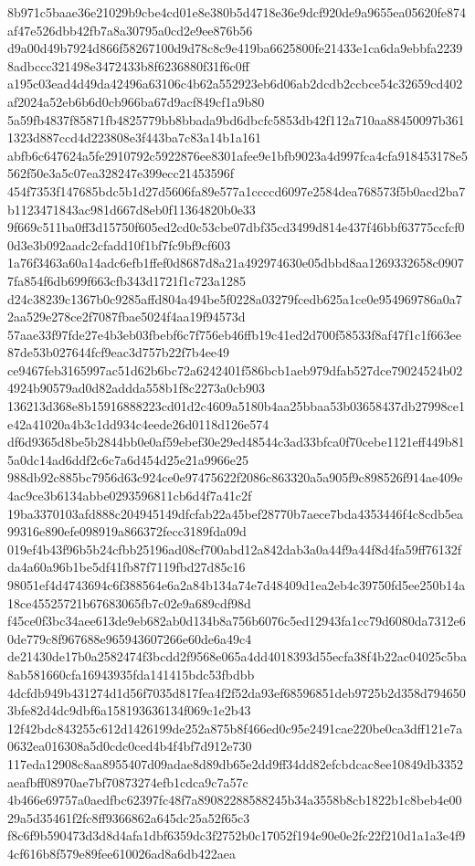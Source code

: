\documentclass[11pt,a4paper]{article}
\begin{document}
{8b971c5baae36e21029b9cbe4cd01e8e380b5d4718e36e9dcf920de9a9655ea05620fe874af47e526dbb42fb7a8a30795a0cd2e9ee876b56
d9a00d49b7924d866f58267100d9d78c8c9e419ba6625800fe21433e1ca6da9ebbfa22398adbccc321498e3472433b8f6236880f31f6c0ff
a195c03ead4d49da42496a63106c4b62a552923eb6d06ab2dcdb2ccbce54c32659cd402af2024a52eb6b6d0cb966ba67d9acf849cf1a9b80
5a59fb4837f85871fb4825779bb8bbada9bd6dbcfc5853db42f112a710aa88450097b3611323d887ccd4d223808e3f443ba7c83a14b1a161
abfb6c647624a5fe2910792c5922876ee8301afee9e1bfb9023a4d997fca4cfa918453178e5562f50e3a5c07ea328247e399ecc21453596f
454f7353f147685bdc5b1d27d5606fa89e577a1ccccd6097e2584dea768573f5b0acd2ba7b1123471843ac981d667d8eb0f11364820b0e33
9f669c511ba0ff3d15750f605ed2cd0c53cbe07dbf35cd3499d814e437f46bbf63775ccfcf00d3e3b092aadc2cfadd10f1bf7fc9bf9cf603
1a76f3463a60a14adc6efb1ffef0d8687d8a21a492974630e05dbbd8aa1269332658c09077fa854f6db699f663cfb343d1721f1c723a1285
d24c38239c1367b0c9285affd804a494be5f0228a03279fcedb625a1ce0e954969786a0a72aa529e278ce2f7087fbae5024f4aa19f94573d
57aae33f97fde27e4b3eb03fbebf6c7f756eb46ffb19c41ed2d700f58533f8af47f1c1f663ee87de53b027644fcf9eac3d757b22f7b4ee49
ce9467feb3165997ac51d62b6bc72a6242401f586bcb1aeb979dfab527dce79024524b024924b90579ad0d82addda558b1f8c2273a0cb903
136213d368e8b15916888223cd01d2c4609a5180b4aa25bbaa53b03658437db27998ce1e42a41020a4b3c1dd934c4eede26d0118d126e574
df6d9365d8be5b2844bb0e0af59ebef30e29ed48544c3ad33bfca0f70cebe1121eff449b815a0dc14ad6ddf2c6c7a6d454d25e21a9966e25
988db92c885bc7956d63c924ce0e97475622f2086c863320a5a905f9c898526f914ae409e4ac9ce3b6134abbe0293596811cb6d4f7a41c2f
19ba3370103afd888c204945149dfcfab22a45bef28770b7aece7bda4353446f4c8cdb5ea99316e890efe098919a866372fecc3189fda09d
019ef4b43f96b5b24cfbb25196ad08cf700abd12a842dab3a0a44f9a44f8d4fa59ff76132fda4a60a96b1be5df41fb87f7119fbd27d85c16
98051ef4d4743694c6f388564e6a2a84b134a74e7d48409d1ea2eb4c39750fd5ee250b14a18ce45525721b67683065fb7c02e9a689cdf98d
f45ce0f3bc34aee613de9eb682ab0d134b8a756b6076c5ed12943fa1cc79d6080da7312e60de779c8f967688e965943607266e60de6a49c4
de21430de17b0a2582474f3bcdd2f9568e065a4dd4018393d55ecfa38f4b22ac04025c5ba8ab581660cfa16943935fda141415bdc53fbdbb
4dcfdb949b431274d1d56f7035d817fea4f2f52da93ef68596851deb9725b2d358d7946503bfe82d4dc9dbf6a158193636134f069c1e2b43
12f42bdc843255c612d1426199de252a875b8f466ed0c95e2491cae220be0ca3dff121e7a0632ea016308a5d0cdc0ced4b4f4bf7d912e730
117eda12908c8aa8955407d09adae8d89db65e2dd9ff34dd82efcbdcac8ee10849db3352aeafbff08970ae7bf70873274efb1cdca9c7a57c
4b466e69757a0aedfbc62397fc48f7a89082288588245b34a3558b8cb1822b1c8beb4e0029a5d35461f2fc8ff9366862a645dc25a52f65c3
f8c6f9b590473d3d8d4afa1dbf6359dc3f2752b0c17052f194e90e0e2fc22f210d1a1a3e4f94cf616b8f579e89fee610026ad8a6db422aea
}
\end{document}
